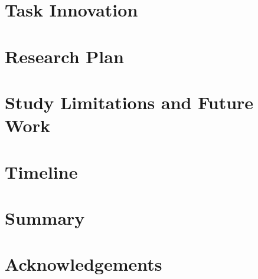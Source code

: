 \documentclass[12pt]{article} %
\begin{document}
\section{Task Innovation}
\label{sec:task_innovation}


\newpage

\section{Research Plan}
\label{sec:research_plan}




\section{Study Limitations and Future Work}
\label{sec:limitations}


\section{Timeline}
\label{sec:timeline}


\section{Summary}
\label{sec:summary}


\section{Acknowledgements}
\label{sec:acknowledgements}




\newpage


\end{document}
